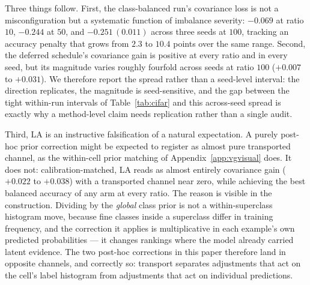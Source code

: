 Three things follow. First, the class-balanced run's covariance loss is not a
misconfiguration but a systematic function of imbalance severity: $-0.069$ at ratio $10$,
$-0.244$ at $50$, and $-0.251\,(0.011)$ across three seeds at $100$, tracking an accuracy
penalty that grows from $2.3$ to $10.4$ points over the same range. Second, the deferred
schedule's covariance gain is positive at every ratio and in every seed, but its magnitude
varies roughly fourfold across seeds at ratio $100$ ($+0.007$ to $+0.031$). We therefore
report the spread rather than a seed-level interval: the direction replicates, the
magnitude is seed-sensitive, and the gap between the tight within-run intervals of
Table~\ref{tab:cifar} and this across-seed spread is exactly why a method-level claim
needs replication rather than a single audit.

Third, LA is an instructive falsification of a natural expectation. A purely post-hoc
prior correction might be expected to register as almost pure transported channel, as the
within-cell prior matching of Appendix~\ref{app:vgvisual} does. It does not:
calibration-matched, LA reads as almost entirely covariance gain ($+0.022$ to $+0.038$) with a
transported channel near zero, while achieving the best balanced accuracy of any arm at every
ratio. The reason is visible in the construction. Dividing by the \emph{global} class
prior is not a within-superclass histogram move, because fine classes inside a superclass
differ in training frequency, and the correction it applies is multiplicative in each
example's own predicted probabilities --- it changes rankings where the model already
carried latent evidence. The two post-hoc corrections in this paper therefore land in
opposite channels, and correctly so: transport separates adjustments that act on the
cell's label histogram from adjustments that act on individual predictions.

